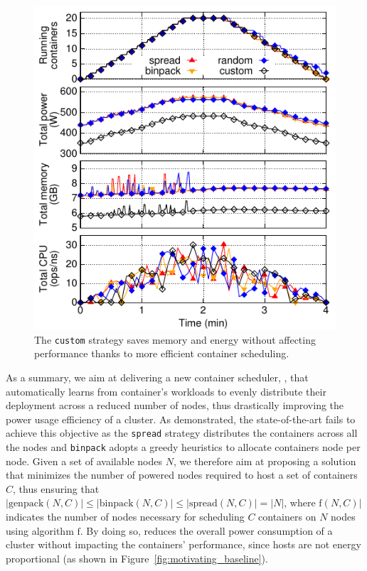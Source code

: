 \begin{figure}[t]
  \centering
  \includegraphics[width=.7\linewidth]{figures/plots/motivating/spread-binpack-random-custom}
  \caption{The \texttt{custom} strategy saves memory and energy without affecting performance thanks to more efficient container scheduling.}
  \label{fig:motivating}
\end{figure}

\newpage

As a summary, we aim at delivering a new container scheduler, \GP{}, that automatically learns from container's workloads to evenly distribute their deployment across a reduced number of nodes, thus drastically improving the power usage efficiency of a cluster.
As demonstrated, the state-of-the-art fails to achieve this objective as the \texttt{spread} strategy distributes the containers across all the nodes and \texttt{binpack} adopts a greedy heuristics to allocate containers node per node.
Given a set of available nodes $N$, we therefore aim at proposing a solution that minimizes the number of powered nodes required to host a set of containers $C$, thus ensuring that $|\text{genpack}(N,C)| \le |\text{binpack}(N,C)| \le |\text{spread}(N,C)| = |N|$, where $\text{f}(N,C)|$ indicates the number of nodes necessary for scheduling $C$ containers on $N$ nodes using algorithm $\text{f}$.
By doing so, \GP{} reduces the overall power consumption of a cluster without impacting the containers' performance, since hosts are not energy proportional (as shown in Figure~\ref{fig:motivating_baseline}).

